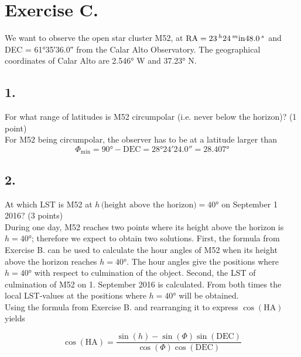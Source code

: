\documentclass[11pt,a4paper,twoside]{article}
\begin{document}
\section*{Exercise C.}

We want to observe the open star cluster M52, at $\text{RA} = \SI{23}{^\hour} \SI{24}{^\minute} \SI{48.0}{^\second}$ and DEC = \ang{61;35;36.0} from the Calar Alto Observatory. The geographical coordinates of Calar Alto are \ang{2.546} W and \ang{37.23} N.

\subsection*{1.} For what range of latitudes is M52 circumpolar (i.e. never below the horizon)? (1 point) \\

For M52 being circumpolar, the observer has to be at a latitude larger than 
\begin{equation}
 \Phi_{\text{min}} = \ang{90} - \text{DEC} = \ang{28;24;24.0} = \ang{28.407}
\end{equation}

\subsection*{2.} At which LST is M52 at $h \, \text{(height above the horizon)} = \ang{40}$ on September 1 2016? (3 points) \\

During one day, M52 reaches two points where its height above the horizon is $h=\ang{40}$; therefore we expect to obtain two solutions. First, the formula from Exercise B. can be used to calculate the hour angles of M52 when its height above the horizon reaches $h=\ang{40}$. The hour angles give the positions where $h=\ang{40}$ with respect to culmination of the object. Second, the LST of culmination of M52 on 1. September 2016 is calculated. From both times the local LST-values at the positions where $h=\ang{40}$ will be obtained. \\

Using the formula from Exercise B. and rearranging it to express $\cos{ \left( \text{HA} \right)}$ yields

\begin{equation}
 \cos{ \left( \text{HA} \right)} = \frac{\sin{\left( h \right)} - \sin{\left( \Phi \right)} \sin{\left( \text{DEC} \right)}}{\cos{ \left( \Phi \right)} \cos{ \left( \text{DEC} \right)}}
\end{equation}
\end{document}
